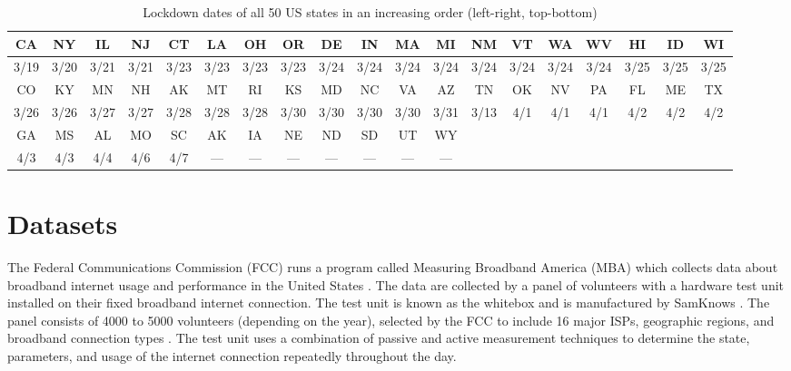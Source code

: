 \documentclass[conference,10pt]{IEEEtran}
\begin{document}
\begin{table}
  \centering
  \caption{Lockdown dates of all 50 US states in an increasing order (left-right, top-bottom)}
  \label{tab:state-lockdown}
  \begin{tabular}{ |c|c|c|c|c|c|c|c|c|c|c|c|c|c|c|c|c|c|c| }
    \hline
    CA   & NY   & IL   & NJ   & CT   & LA   & OH   & OR   & DE   & IN   & MA   & MI   & NM   & VT   & WA   & WV   & HI   & ID   & WI   \\
    \hline
    3/19 & 3/20 & 3/21 & 3/21 & 3/23 & 3/23 & 3/23 & 3/23 & 3/24 & 3/24 & 3/24 & 3/24 & 3/24 & 3/24 & 3/24 & 3/24 & 3/25 & 3/25 & 3/25 \\
    \hline\hline
    CO   & KY   & MN   & NH   & AK   & MT   & RI   & KS   & MD   & NC   & VA   & AZ   & TN   & OK   & NV   & PA   & FL   & ME   & TX   \\
    \hline
    3/26 & 3/26 & 3/27 & 3/27 & 3/28 & 3/28 & 3/28 & 3/30 & 3/30 & 3/30 & 3/30 & 3/31 & 3/13 & 4/1  & 4/1  & 4/1  & 4/2  & 4/2  & 4/2  \\
    \hline\hline
    GA   & MS   & AL   & MO   & SC   & AK   & IA   & NE   & ND   & SD   & UT   & WY   & \multicolumn{7}{|c|}{}                         \\
    \hline
    4/3  & 4/3  & 4/4  & 4/6  & 4/7  & ---  & ---  & ---  & ---  & ---  & ---  & ---  & \multicolumn{7}{|c|}{}                         \\
    \hline
  \end{tabular}
\end{table}


\section{Datasets}
\label{sec:datasets}

The Federal Communications Commission (FCC) runs a program called Measuring Broadband America (MBA) which collects data about broadband internet usage and performance in the United States \cite{mba}. The data are collected by a panel of volunteers with a hardware test unit installed on their fixed broadband internet connection. The test unit is known as the whitebox and is manufactured by SamKnows \cite{sam}. The panel consists of 4000 to 5000 volunteers (depending on the year), selected by the FCC to include 16 major ISPs, geographic regions, and broadband connection types \cite{fcc-report-appendix}. The test unit uses a combination of passive and active measurement techniques to determine the state, parameters, and usage of the internet connection repeatedly throughout the day.
\end{document}
